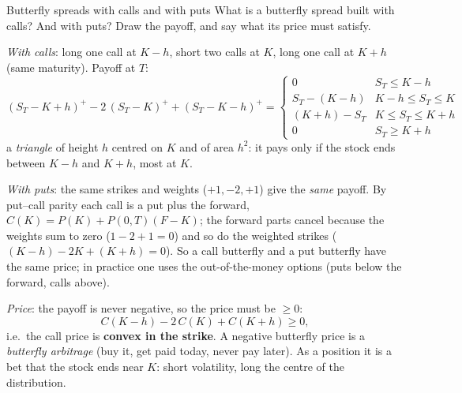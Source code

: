 \begin{question}{\Theory {}}{Butterfly spreads with calls and with puts}
What is a butterfly spread built with calls? And with puts? Draw the payoff, and say what its price must satisfy.
\end{question}
\begin{answer}
\emph{With calls}: long one call at $K - h$, short two calls at $K$, long one call at $K + h$ (same maturity). Payoff at $T$:
\[
  (S_T - K + h)^+ - 2\,(S_T - K)^+ + (S_T - K - h)^+ =
  \begin{cases}
    0 & S_T \le K - h \\
    S_T - (K - h) & K - h \le S_T \le K \\
    (K + h) - S_T & K \le S_T \le K + h \\
    0 & S_T \ge K + h
  \end{cases}
\]
a \emph{triangle} of height $h$ centred on $K$ and of area $h^2$: it pays only if the stock ends between $K - h$ and $K + h$,
most at $K$.

\emph{With puts}: the same strikes and weights ($+1, -2, +1$) give the \emph{same} payoff. By put--call parity each call is a put
plus the forward, $C(K) = P(K) + P(0,T)(F - K)$; the forward parts cancel because the weights sum to zero
($1 - 2 + 1 = 0$) and so do the weighted strikes ($(K - h) - 2K + (K + h) = 0$). So a call butterfly and a put butterfly
have the same price; in practice one uses the out-of-the-money options (puts below the forward, calls above).

\emph{Price}: the payoff is never negative, so the price must be $\ge 0$:
\[
  C(K - h) - 2\,C(K) + C(K + h) \ge 0 ,
\]
i.e.\ the call price is \textbf{convex in the strike}. A negative butterfly price is a \emph{butterfly arbitrage} (buy it, get
paid today, never pay later). As a position it is a bet that the stock ends near $K$: short volatility, long the
centre of the distribution.
\end{answer}

